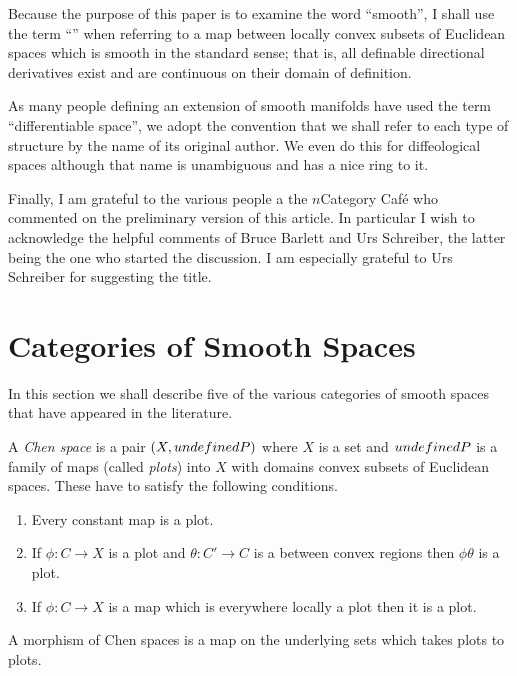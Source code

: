 \documentclass[%
a4paper,%
arxiv,%
defaults
]{myclass}
\begin{document}
\medskip

Because the purpose of this paper is to examine the word ``smooth'', I shall use the term ``\cimap'' when referring to a map between locally convex subsets of Euclidean spaces which is smooth in the standard sense; that is, all definable directional derivatives exist and are continuous on their domain of definition.

As many people defining an extension of smooth manifolds have used the term ``differentiable space'', we adopt the convention that we shall refer to each type of structure by the name of its original author.
We even do this for diffeological spaces although that name is unambiguous and has a nice ring to it.

Finally, I am grateful to the various people a the \(n\)\enhyp{}Category Caf\'e who commented on the preliminary version of this article.
In particular I wish to acknowledge the helpful comments of Bruce Barlett and Urs Schreiber, the latter being the one who started the discussion.
I am especially grateful to Urs Schreiber for suggesting the title.

\section{Categories of Smooth Spaces}
\label{sec:smoothcats}

In this section we shall describe five of the various categories of smooth spaces that have appeared in the literature.

\begin{defn}
\label{def:chen}
 A \emph{Chen space} is a pair \((X, \m{P})\) where \(X\) is a set and \(\m{P}\) is a family of maps (called \emph{plots}) into \(X\) with domains convex subsets of Euclidean spaces.
 These have to satisfy the following conditions.
 \begin{enumerate}
 \item
  Every constant map is a plot.
 \item
  If \(\phi \colon C \to X\) is a plot and
   \(\theta \colon C' \to C\)
  is a \cimap between convex regions then \(\phi\theta\) is a plot.
 \item
  If \(\phi \colon C \to X\) is a map which is everywhere locally a plot then it is a plot.
 \end{enumerate}

 A morphism of Chen spaces is a map on the underlying sets which takes plots to plots.
\end{defn}
\end{document}
